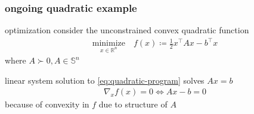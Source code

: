 \documentclass[10pt,dvipsnames*]{beamer}
\begin{document}
%
\begin{frame}
  \frametitle{ongoing quadratic example}
  \pause
  \begin{block}{optimization}
    consider the unconstrained convex quadratic function
    \begin{align}
      \label{eq:quadratic-program}
      \underset{x \in \mathbb{R}^n}{\text{minimize}} \quad f(x) \coloneqq \tfrac 12 x^{\top} A x - b^{\top} x
    \end{align}
    where $A \succ 0, A \in \mathbb{S}^{n}$
  \end{block}
  \pause
  \begin{block}{linear system}
    solution to \cref{eq:quadratic-program} solves $Ax = b$
    \begin{align}
      \label{eq:linear-system}
      \nabla_x f(x) = 0 \iff Ax - b = 0
    \end{align}
    because of convexity in $f$ due to structure of $A$
  \end{block}
\end{frame}
%
\end{document}
